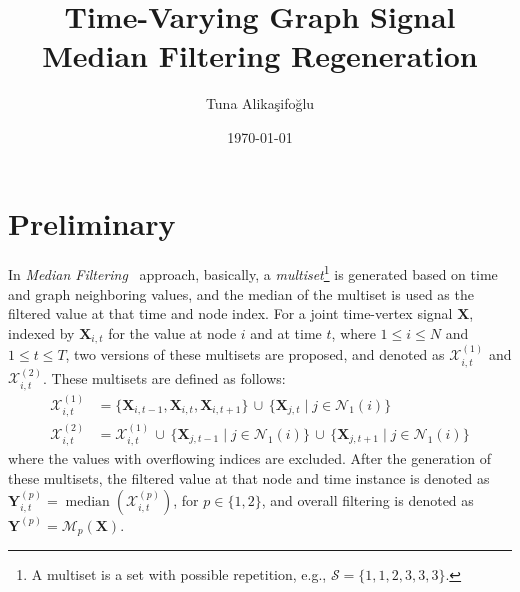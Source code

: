 \documentclass[a4paper, 10pt]{article}
\title{\vspace{-1cm}\textbf{Time-Varying Graph Signal Median Filtering Regeneration}}
\author{Tuna Alikaşifoğlu}
\date{\today}
\begin{document}
\maketitle

\section{Preliminary}
In \textit{Median Filtering}~\cite{median} approach, basically, a \textit{multiset}\footnote{A multiset is a set with possible repetition, e.g., \(\mathcal{S}=\{1,1,2,3,3,3\}\).} is generated based on time and graph neighboring values, and the median of the multiset is used as the filtered value at that time and node index. For a joint time-vertex signal $\mathbf{X}$, indexed by $\mathbf{X}_{i,t}$ for the value at node $i$ and at time $t$, where $1\leq i \leq N$ and $1\leq t \leq T$, two versions of these multisets are proposed, and denoted as $\mathcal{X}_{i,t}^{(1)}$ and $\mathcal{X}_{i,t}^{(2)}$. These multisets are defined as follows:
\begin{align}
	\mathcal{X}_{i,t}^{(1)} & = \{\mathbf{X}_{i,t-1},\mathbf{X}_{i,t},\mathbf{X}_{i,t+1}\}\,\cup\,\{\mathbf{X}_{j,t}\mid j\in\mathcal{N}_{1}(i)\}                         \\
	\mathcal{X}_{i,t}^{(2)} & = \mathcal{X}_{i,t}^{(1)}\,\cup\,\{\mathbf{X}_{j,t-1}\mid j\in\mathcal{N}_{1}(i)\}\,\cup\,\{\mathbf{X}_{j,t+1}\mid j\in\mathcal{N}_{1}(i)\}
\end{align}
where the values with overflowing indices are excluded. After the generation of these multisets, the filtered value at that node and time instance is denoted as $\mathbf{Y}_{i,t}^{(p)}=\operatorname{median}(\mathcal{X}_{i,t}^{(p)})$, for $p\in\{1,2\}$, and overall filtering is denoted as $\mathbf{Y}^{(p)} = \mathcal{M}_{p}(\mathbf{X})$.
\end{document}
